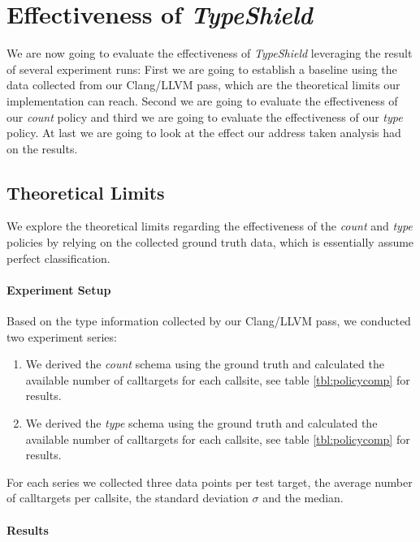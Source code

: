 \section{Effectiveness of \textit{TypeShield}}
\label{section:typeshieldeffectiveness}
We are now going to evaluate the effectiveness of \textit{TypeShield} leveraging the result of several experiment runs: First we are going to establish a baseline using the data collected from our Clang/LLVM pass, which are the theoretical limits our implementation can reach. Second we are going to evaluate the effectiveness of our \textit{count} policy and third we are going to evaluate the effectiveness of our \textit{type} policy. At last we are going to look at the effect our address taken analysis had on the results.

\subsection{Theoretical Limits}
\label{subsection:theoreticallimit}
We explore the theoretical limits regarding the effectiveness of the \textit{count} and \textit{type} policies by relying on the collected ground truth data, which is essentially assume perfect classification.

\paragraph{Experiment Setup} Based on the type information collected by our Clang/LLVM pass, we conducted two experiment series:
\begin{enumerate}
\item We derived the \textit{count} schema using the ground truth and calculated the available number of calltargets for each callsite, see table \ref{tbl:policycomp} for results.
\item We derived the \textit{type} schema using the ground truth and calculated the available number of calltargets for each callsite, see table \ref{tbl:policycomp} for results.
\end{enumerate}
For each series we collected three data points per test target, the average number of calltargets per callsite, the standard deviation $\sigma$ and the median.

\paragraph{Results}

